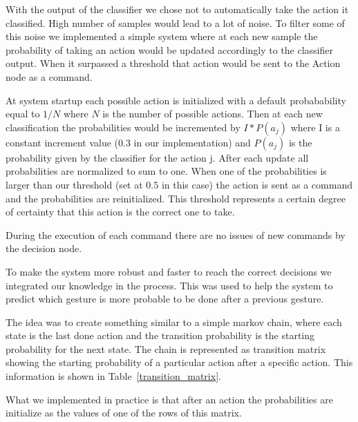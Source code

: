 With the output of the classifier we chose not to automatically take the action it classified. High number of samples would lead to a lot of noise. To filter some of this noise we implemented a simple system where at each new sample the probability of taking an action would be updated accordingly to the classifier output. When it surpassed a threshold that action would be sent to the Action node as a command.

At system startup each possible action is initialized with a default probabability equal to $1/N$ where $N$ is the number of possible actions.
Then at each new classification the probabilities would be incremented by $I*P(a_j)$ where I is a constant increment value ($0.3$ in our implementation) and $P(a_j)$ is the probability given by the classifier for the action j.
After each update all probabilities are normalized to sum to one.
When one of the probabilities is larger than our threshold (set at $0.5$ in this case) the action is sent as a command and the probabilities are reinitialized. This threshold represents a certain degree of certainty that this action is the correct one to take.

During the execution of each command there are no issues of new commands by the decision node.

To make the system more robust and faster to reach the correct decisions we integrated our knowledge in the process. This was used to help the system to predict which gesture is more probable to be done after a previous gesture.

The idea was to create something similar to a simple markov chain, where each state is the last done action and the transition
probability is the starting probability for the next state.
The chain is represented as transition matrix showing the starting probability of a particular action after a specific action. This information is shown in Table~\ref{transition_matrix}.


What we implemented in practice is that after an action the probabilities are initialize as the values of one of the rows of this matrix.
